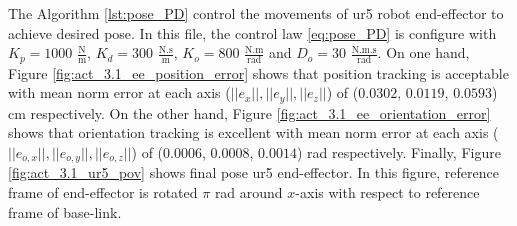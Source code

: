 The Algorithm \ref{lst:pose_PD} control the movements of ur5 robot end-effector to achieve desired pose. In this file, the control law \ref{eq:pose_PD} is configure with ${K_{p}}=1000$ $\mathrm{\frac{N}{m}}$, $K_{d}= 300$ $\mathrm{\frac{N.s}{m}}$, ${K_{o}}=800$ $\mathrm{\frac{N.m}{rad}}$ and $D_{o}= 30$ $\mathrm{\frac{N.m.s}{rad}}$. On one hand, Figure \ref{fig:act_3.1_ee_position_error} shows that position tracking is acceptable with mean norm error at each axis ($||e_x||, ||e_y||, ||e_z||$) of ($0.0302$, $0.0119$, $0.0593$) cm respectively. On the other hand, Figure \ref{fig:act_3.1_ee_orientation_error} shows that orientation tracking is excellent with mean norm error at each axis ($||e_{o,x}||, ||e_{o,y}||, ||e_{o,z}||$) of ($0.0006$, $0.0008$, $0.0014$) rad respectively. Finally, Figure \ref{fig:act_3.1_ur5_pov} shows final pose ur5 end-effector. In this figure, reference frame of end-effector is rotated $\pi$ rad  around $x$-axis with respect to reference frame of base-link. \vspace{.5cm}

